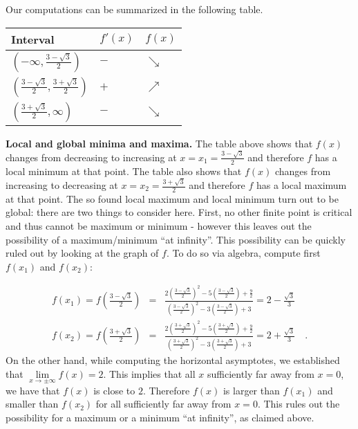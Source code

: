 {Our computations can be summarized in the following table. 

\begin{tabular}{|lll|}\hline
Interval & $f'(x)$ & $f(x)$   \\\hline
$\left(-\infty, \frac{3- \sqrt{3}}{2}\right)$ & $-$& $\searrow $ \\\hline
$\left(\frac{3- \sqrt{3}}{2}, \frac{3+ \sqrt{3}}{2} \right)$ &$+$&$\nearrow$\\\hline
$\left( \frac{3+ \sqrt{3}}{2}, \infty\right)$&$-$&$\searrow$ \\\hline
\end{tabular}

\textbf{Local and global minima and maxima. } The table above shows that $f(x)$ changes from decreasing to increasing at $x=x_1=\frac{3- \sqrt{3}}{2}$ and therefore $f$ has a local minimum at that point. The table also shows that $f(x)$ changes from increasing to decreasing at $ x=x_2=\frac{3+ \sqrt{3}}{2}$ and therefore $f$ has a local maximum at that point. The so found local maximum and local minimum turn out to be global: there are two things to consider here. First, no other finite point is critical and thus cannot be maximum or minimum - however this leaves out the possibility of a maximum/minimum ``at infinity''. This possibility can be quickly ruled out by looking at the graph of $f$. To do so via algebra, compute first $f(x_1)$ and $f(x_2)$:

\[
\begin{array}{rcl}
\displaystyle f(x_1)= f\left(\frac{3- \sqrt{3}}{2} \right)&=& \displaystyle \frac{2\left(\frac{3- \sqrt{3}}{2} \right)^2-5\left(\frac{3- \sqrt{3}}{2} \right)+\frac{9}{2} }{\left(\frac{3- \sqrt{3}}{2} \right)^2- 3 \left(\frac{3- \sqrt{3}}{2} \right)+3}=2-\frac{\sqrt{3}}{3} \\

\displaystyle f(x_2)= f\left(\frac{3+ \sqrt{3}}{2} \right)&=& \displaystyle \frac{2\left(\frac{3+ \sqrt{3}}{2} \right)^2-5\left(\frac{3+ \sqrt{3}}{2} \right)+\frac{9}{2} }{\left(\frac{3+ \sqrt{3}}{2} \right)^2- 3 \left(\frac{3+ \sqrt{3}}{2} \right)+3}=2+\frac{\sqrt{3}}{3}\quad . 
\end{array}
\]
On the other hand, while computing the horizontal asymptotes, we established that $\lim\limits_{x\to\pm \infty}f(x)=2$. This implies that all $x$ sufficiently far away from $x=0$, we have that $f(x)$ is close to $2 $. Therefore $f(x)$ is larger than $f(x_1)$ and smaller than $f(x_2)$ for all sufficiently far away from $x=0$. This rules out the possibility for a maximum or a minimum ``at infinity'', as claimed above.

}
